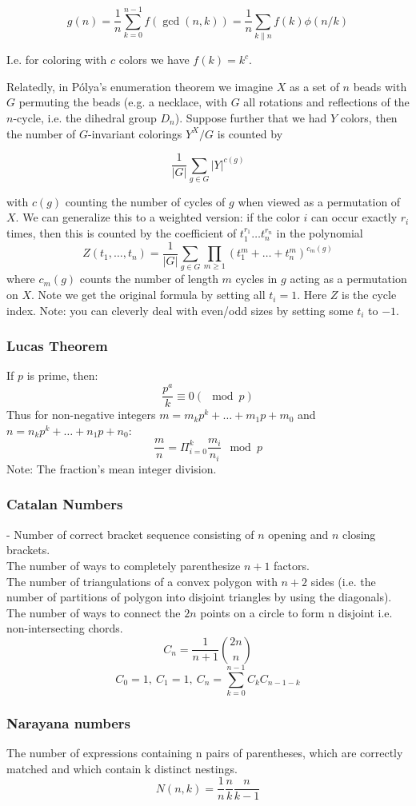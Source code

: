 \documentclass[
	a4paper,
	landscape,
	10pt,
]{article}
\begin{document}
\begin{multicols}{3}
		$$g(n) = \frac{1}{n} \sum_{k=0}^{n-1} f(\gcd(n, k))
			= \frac{1}{n}\sum_{k \| n} f(k) \phi(n / k)$$

		I.e. for coloring with $c$ colors we have $f(k) = k^c$.

		Relatedly, in P\'olya's enumeration theorem we imagine $X$ as a set of $n$
		beads with $G$ permuting the beads (e.g. a necklace, with $G$ all rotations and
		reflections of the $n$-cycle, i.e. the dihedral group $D_n$).
		Suppose further that we had $Y$ colors, then
		the number of $G$-invariant colorings $Y^X / G$ is counted by

		$$\frac{1}{|G|}\sum_{g\in G} |Y|^{c(g)}$$

		with $c(g)$ counting the number of cycles of $g$ when viewed as a permutation
		of $X$. We can generalize this to a weighted version: if the color $i$ can
		occur exactly $r_i$ times, then this is counted by the coefficient of
		$t_1^{r_1}\dots t_n^{r_n}$ in the polynomial
		$$Z(t_1,\dots,t_n) = \frac{1}{|G|}\sum_{g\in G} \prod_{m\geq 1}
			(t_1^m+\dots+t_n^m)^{c_m(g)}$$
		where $c_m(g)$ counts the number of length $m$ cycles in $g$ acting as a
		permutation on $X$. Note we get the original formula by setting all $t_i=1$.
		Here $Z$ is the cycle index. Note: you can cleverly deal with even/odd sizes
		by setting some $t_i$ to $-1$.
		
		\subsubsection*{Lucas Theorem}
		If $p$ is prime, then:
		$$ \frac{p^a}{k} \equiv 0 (\mod p) $$
		Thus for non-negative integers $m = m_kp^k + \hdots + m_1 p + m_0$ and $n = n_k p^k + \hdots + n_1p + n_0$:
		$$ \frac{m}{n} =  \Pi_{i=0}^{k} \frac{m_i}{n_i} \mod p $$ Note: The fraction's mean integer division.
		

		\subsubsection*{Catalan Numbers} - Number of correct bracket sequence consisting of $n$ opening and $n$
		closing brackets. \\
		The number of ways to completely parenthesize $n+1$ factors. \\
		The number of triangulations of a convex polygon with $n+2$
		sides (i.e. the number of partitions of polygon into disjoint triangles by using the diagonals). \\
		The number of ways to connect the $2n$
		points on a circle to form n disjoint i.e. non-intersecting chords.
		$$ C_n = \frac{1}{n+1} \binom{2n}{n}$$
		$$ C_0 = 1,~C_1 = 1, ~C_n = \sum_{k=0}^{n-1}C_k C_{n-1-k}  $$

		\subsubsection*{Narayana numbers} The number of expressions containing n pairs of parentheses, which are correctly matched and which contain k distinct nestings. 
		$$ N(n,k) = \frac{1}{n} \frac{n}{k} \frac{n}{k-1} $$
\end{multicols}
\end{document}
